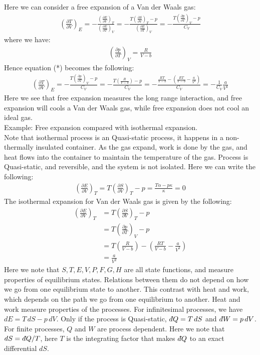 \documentclass[11pt,oneside]{book}
\theoremstyle{break}
\theoremstyle{break}
\newcommand{\pd}{\partial}
\newcommand{\lr}[1]{\left( #1 \right)}
\newcommand{\dbar}{d\hspace*{-0.08em}\bar{}\hspace*{0.1em}}
\newcommand{\example}{\color{green}Example: \color{black}}
\begin{document}
Here we can consider a free expansion of a Van der Waals gas:
\begin{align*}
\lr{\frac{\pd T}{\pd V}}_E = - \frac{\lr{\frac{\pd E}{\pd V}}_T}{\lr{\frac{\pd E}{\pd T}}_V} = - \frac{T\lr{\frac{\pd S}{\pd V}}_T - p}{\lr{\frac{\pd E}{\pd T}}_V} =- \frac{T\lr{\frac{\pd p}{\pd T}}_V - p}{C_V} \tag{*}
\end{align*}
where we have:
\begin{align*}
\lr{\frac{\pd p}{\pd T}}_V = \frac{R}{V-b}
\end{align*}
Hence equation (*) becomes the following:
\begin{align*}
\lr{\frac{\pd T}{\pd V}}_E =- \frac{T\lr{\frac{\pd p}{\pd T}}_V - p}{C_V} =- \frac{T \lr{\frac{R}{V-b}} - p}{C_V}  = -\frac{\frac{RT}{V-b} - \left( \frac{RT}{V-b}-\frac{a}{V^2}\right)}{C_V} = - \frac{1}{C_V} \frac{a}{V^2}
\end{align*}
Here we see that free expansion measures the long range interaction, and free expansion will cools a Van der Waals gas, while free expansion does not cool an ideal gas.\\


\example Free expansion compared with isothermal expansion.\\
Note that isothermal process is an Quasi-static process, it happens in a non-thermally insulated container. As the gas expand, work is done by the gas, and heat flows into the container to maintain the temperature of the gas. Process is Quasi-static, and reversible, and the system is not isolated. Here we can write the following:
\begin{align*}
\lr{\frac{\pd E}{\pd V}}_T = T \lr{\frac{\pd S}{\pd V}}_T - p = \frac{T \alpha  - p\kappa}{\kappa} = 0
\end{align*}
The isothermal expansion for Van der Waals gas is given by the following:
\begin{align*}
\lr{\frac{\pd E}{\pd V}}_T &= T\lr{\frac{\pd S}{\pd V}}_T - p\\
&= T\lr{\frac{\pd p}{\pd T}}_V - p\\
&= T\lr{\frac{R}{V-b}} - \lr{\frac{RT}{V-b} - \frac{a}{V^2}}\\
&= \frac{a}{V^2}
\end{align*}
\hfill\break
\hfill\break
\hfill\break
Here we note that $S,T,E,V,P,F,G,H$ are all state functions, and measure properties of equilibrium states. Relations between them do not depend on how we go from one equilibrium state to another. This contrast with heat and work, which depends on the path we go from one equilibrium to another. Heat and work measure properties of the processes. For infinitesimal processes, we have $dE = T\, dS - p\,dV$. Only if the process is Quasi-static, $\dbar Q= T\, dS$ and $\dbar W = p\, dV$. For finite processes, $Q$ and $W$ are process dependent. Here we note that $dS = \dbar Q /T$, here $T$ is the integrating factor that makes $\dbar Q$ to an exact differential $dS$. 
\end{document}
